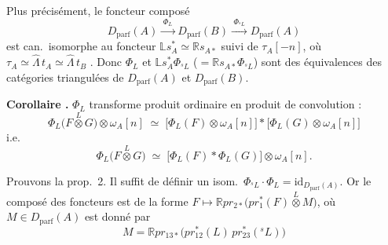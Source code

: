 \documentclass[11pt,a4paper]{article}
\begin{document}

Plus précisément, le foncteur composé
\[
  D_{\mathrm{parf}}(A) \xrightarrow{\;\Phi_L\;} D_{\mathrm{parf}}(B)
  \xrightarrow{\;\Phi_{{}^{s}L}\;} D_{\mathrm{parf}}(A)
\]
est  can.\ isomorphe au foncteur
$\mathbb{L}s_A^{*} \simeq \mathbb{R}s_{A*}$ suivi de $\tau_A[-n]$,
\struck{\ill{}} où $\tau_A \simeq \hat\Lambda\, t_A \simeq \hat\Lambda\, t_B$
. Donc $\Phi_L$ et $\mathbb{L}s_A^{*}\Phi_{{}^{s}L}$
($= \mathbb{R}s_{A*}\Phi_{{}^{s}L}$) \struck{\ill{}} sont des équivalences
des catégories triangulées de $D_{\mathrm{parf}}(A)$ et $D_{\mathrm{parf}}(B)$.



\struck{\ill{}}


\textbf{Corollaire .} \struck{\ill{}} $\Phi_L$ transforme
produit ordinaire en produit de convolution :
\[
  \Phi_L\bigl(F \overset{L}{\otimes} G\bigr) \otimes \omega_A[n]
  \;\simeq\;
  \bigl[\Phi_L(F) \otimes \omega_A[n]\bigr] * \bigl[\Phi_L(G) \otimes \omega_A[n]\bigr]
\]
i.e.
\[
  \Phi_L\bigl(F \overset{L}{\otimes} G\bigr)
  \;\simeq\;
  \bigl[\Phi_L(F) * \Phi_L(G)\bigr] \otimes \omega_A[n].
\]


Prouvons la prop.\ 2. Il suffit de définir un isom.\
$\Phi_{{}^{s}L} \cdot \Phi_L = \mathrm{id}_{D_{\mathrm{parf}}(A)}$. Or le
composé des foncteurs est de la forme
$F \mapsto \mathbb{R}pr_{2*}\bigl(pr_1^{*}(F) \overset{L}{\otimes} M\bigr)$,
où $M \in D_{\mathrm{parf}}(A)$ est donné par
\[
  M = \mathbb{R}pr_{13*}\bigl(pr_{12}^{*}(L)\, pr_{23}^{*}({}^{s}L)\bigr)
\]

\end{document}

